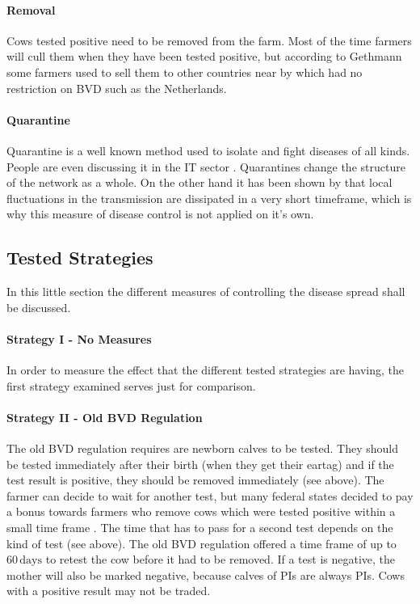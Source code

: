 \paragraph{Removal}
Cows tested positive need to be removed from the farm. Most of the time farmers will cull them when they have been tested positive, but according to Gethmann some farmers used to sell them to other countries near by which had no restriction on BVD such as the Netherlands.

\paragraph{Quarantine}
Quarantine is a well known method used to isolate and fight diseases of all kinds. People are even discussing it in the IT sector \citep{moore2003internet}. Quarantines change the structure of the network as a whole. On the other hand it has been shown by \citep{Keeling20051} that local fluctuations in the transmission are dissipated in a very short timeframe, which is why this measure of disease control is not applied on it's own.

\subsection{Tested Strategies}
In this little section the different measures of controlling the disease spread shall be discussed.
\paragraph{Strategy I - No Measures}
In order to measure the effect that the different tested strategies are having, the first strategy examined serves just for comparison.
\paragraph{Strategy II - Old BVD Regulation}
The old BVD regulation requires are newborn calves to be tested. They should be tested immediately after their birth (when they get their eartag) and if the test result is positive, they should be removed immediately (see above). The farmer can decide to wait for another test, but many federal states decided to pay a bonus towards farmers who remove cows which were tested positive within a small time frame \citep{personalCom}. The time that has to pass for a second test depends on the kind of test (see above). The old BVD regulation offered a time frame of up to $60\,\text{days}$ to retest the cow before it had to be removed. 
If a test is negative, the mother will also be marked negative, because calves of PIs are always PIs. Cows with a positive result may not be traded.
